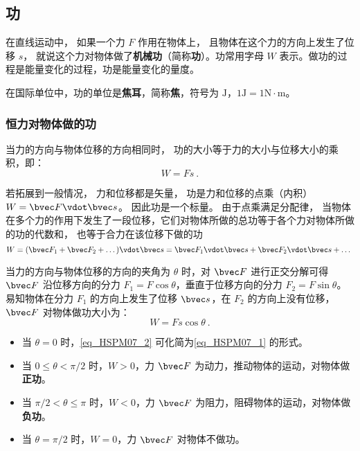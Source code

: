 

\subsection{功}

在直线运动中， 如果一个力 $F$ 作用在物体上， 且物体在这个力的方向上发生了位移 $s$， 就说这个力对物体做了\textbf{机械功}（简称\textbf{功}）。功常用字母 $W$ 表示。做功的过程是能量变化的过程，功是能量变化的量度。

在国际单位中，功的单位是\textbf{焦耳}，简称\textbf{焦}，符号为 $\mathrm{J}$，$1\mathrm{J}=1\mathrm{N \cdot m}$。

\subsubsection{恒力对物体做的功}

当力的方向与物体位移的方向相同时， 功的大小等于力的大小与位移大小的乘积，即：
\begin{equation}\label{eq_HSPM07_1}
W=Fs~.
\end{equation}

若拓展到一般情况， 力和位移都是矢量， 功是力和位移的点乘（内积） $W = \bvec F \vdot \bvec s$。 因此功是一个标量。 由于点乘满足分配律， 当物体在多个力的作用下发生了一段位移，它们对物体所做的总功等于各个力对物体所做的功的代数和， 也等于合力在该位移下做的功
\begin{equation}
W = (\bvec F_1 + \bvec F_2 + \dots)\vdot \bvec s = \bvec F_1 \vdot \bvec s + \bvec F_2 \vdot \bvec s + \dots~
\end{equation}

当力的方向与物体位移的方向的夹角为 $\theta$ 时，对 $\bvec F$ 进行正交分解可得 $\bvec F$ 沿位移方向的分力 $F_1=F\cos \theta$，垂直于位移方向的分力 $F_2=F\sin \theta$。易知物体在分力 $F_1$ 的方向上发生了位移 $\bvec s$，在 $F_2$ 的方向上没有位移，$\bvec F$ 对物体做功大小为：
\begin{equation}\label{eq_HSPM07_2}
W=Fs\cos \theta~.
\end{equation}

\begin{itemize}
\item 当 $\theta = 0$ 时，\autoref{eq_HSPM07_2} 可化简为\autoref{eq_HSPM07_1} 的形式。
\item 当 $0\leq \theta < \pi/2$ 时，$W>0$，力 $\bvec F$ 为动力，推动物体的运动，对物体做\textbf{正功}。
\item 当 $\pi/2< \theta \leq \pi$ 时，$W<0$，力 $\bvec F$ 为阻力，阻碍物体的运动，对物体做\textbf{负功}。
\item 当 $\theta = \pi/2$ 时，$W=0$，力 $\bvec F$ 对物体不做功。
\end{itemize}

